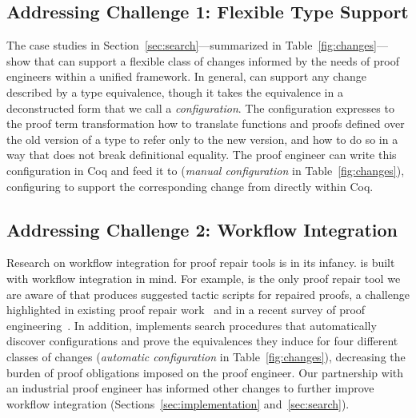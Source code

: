\subsection*{Addressing Challenge 1: Flexible Type Support}

The case studies in Section~\ref{sec:search}---summarized in Table~\ref{fig:changes}---show that \toolname can support a flexible class of changes informed by the needs of proof engineers within a unified framework.
In general, \toolname can support any change described by a type equivalence, though it takes the equivalence in a
deconstructed form that we call a \textit{configuration}.
The configuration expresses to the proof term transformation how to translate functions and proofs defined over the old version of a type
to refer only to the new version, and how to do so in a way that does not break definitional equality.
The proof engineer can write this configuration in Coq and feed it to \toolname (\textit{manual configuration} in Table~\ref{fig:changes}),
configuring \toolname to support the corresponding change from directly within Coq.

\subsection*{Addressing Challenge 2: Workflow Integration}

Research on workflow integration for proof repair tools is in its infancy.
\toolname is built with workflow integration in mind.
For example, \toolname is the only proof repair tool we are aware of that produces suggested tactic scripts for repaired proofs,
a challenge highlighted in existing proof repair work~\cite{pumpkinpatch, robert2018} and in 
a recent survey of proof engineering~\cite{PGL-045}.
In addition, \toolname implements search procedures that 
automatically discover configurations and prove the equivalences they induce for four different classes of 
changes (\textit{automatic configuration} in Table~\ref{fig:changes}),
decreasing the burden of proof obligations imposed on the proof engineer.
Our partnership with an industrial proof engineer has informed other changes to further improve workflow integration
(Sections~\ref{sec:implementation} and~\ref{sec:search}).


